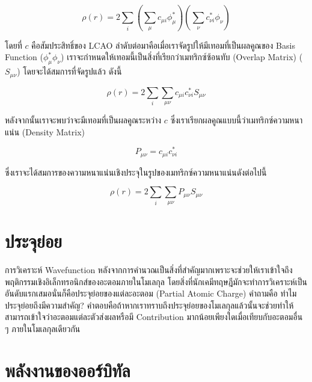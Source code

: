 \begin{equation}
    \rho (r) = 2 \sum_{i} \left ( \sum_{\mu} c_{\mu i} \phi_{\mu}^{*} \right ) 
    \left ( \sum_{\nu} c^{*}_{\nu i}  \phi_{\nu} \right )
\end{equation}

\noindent โดยที่ $c$ คือสัมประสิทธิ์ของ LCAO ลำดับต่อมาคือเมื่อเราจัดรูปให้มีเทอมที่เป็นผลคูณของ Basis Function ($\phi_{\mu}^{*} 
\phi_{\nu}$) เราจะกำหนดให้เทอมนี้เป็นสิ่งที่เรียกว่าเมทริกซ์ซ้อนทับ (Overlap Matrix) ($S_{\mu\nu}$) โดยจะได้สมการที่จัดรูปแล้ว ดังนี้

\begin{equation}
    \rho (r) = 2 \sum_{i}\sum_{\mu\nu} c_{\mu i} c^{*}_{\nu i} S_{\mu\nu}
\end{equation}

หลังจากนั้นเราจะพบว่าจะมีเทอมที่เป็นผลคูณระหว่าง $c$ ซึ่งเราเรียกผลคูณแบบนี้ว่าเมทริกซ์ความหนาแน่น (Density Matrix) 

\begin{equation}\label{eq:density_matrix}
    P_{\mu\nu} = c_{\mu i} c^{*}_{\nu i}
\end{equation}

\noindent ซึ่งเราจะได้สมการของความหนาแน่นเชิงประจุในรูปของเมทริกซ์ความหนาแน่นดังต่อไปนี้

\begin{equation}\label{eq:charge_density_matrix}
    \rho (r) = 2 \sum_{i} \sum_{\mu\nu} P_{\mu\nu}S_{\mu\nu}
\end{equation}

\section{ประจุย่อย}
\label{sec:partial_charge}

การวิเคราะห์ Wavefunction หลังจากการคำนวณเป็นสิ่งที่สำคัญมากเพราะจะช่วยให้เราเข้าใจถึงพฤติกรรมเชิงอิเล็กทรอนิกส์ของอะตอมภายในโมเลกุล 
โดยสิ่งที่นักเคมีทฤษฎีมักจะทำการวิเคราะห์เป็นอันดับแรกเสมอนั่นก็คือประจุย่อยของแต่ละอะตอม (Partial Atomic Charge) คำถามคือ 
ทำไมประจุย่อยถึงมีความสำคัญ? คำตอบคือถ้าหากเราทราบถึงประจุย่อยของโมเลกุลแล้วนั้นจะช่วยทำให้สามารถเข้าใจว่าอะตอมแต่ละตัวส่งผลหรือมี 
Contribution มากน้อยเพียงใดเมื่อเทียบกับอะตอมอื่น ๆ ภายในโมเลกุลเดียวกัน

\section{พลังงานของออร์บิทัล}
\label{sec:ener_orb}


